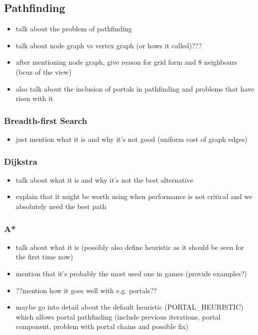 \subsection{Pathfinding}

\begin{itemize}
    \item talk about the problem of pathfinding
    \item talk about node graph vs vertex graph (or hows it called)???
    \item after mentioning node graph, give reason for grid form
	    and 8 neighbours (bcuz of the view)
    \item also talk about the inclusion of portals in pathfinding
	    and problems that have risen with it
\end{itemize}

\subsubsection{Breadth-first Search}

\begin{itemize}
    \item just mention what it is and why it's not good
	    (uniform cost of graph edges)
\end{itemize}

\subsubsection{Dijkstra}

\begin{itemize}
    \item talk about what it is and why it's not the best alternative
    \item explain that it might be worth using when performance is
	    not critical and we absolutely need the best path
\end{itemize}

\subsubsection{A*}

\begin{itemize}
	\item talk about what it is (possibly also define heuristic as it should
		be seen for the first time now)
	\item mention that it's probably the most used one in games (provide examples?)
	\item ??mention how it goes well with e.g. portals??
	\item maybe go into detail about the default heuristic (PORTAL\_HEURISTIC) which
		allows portal pathfinding (include previous iterations, portal component,
		problem with portal chains and possible fix)
\end{itemize}

